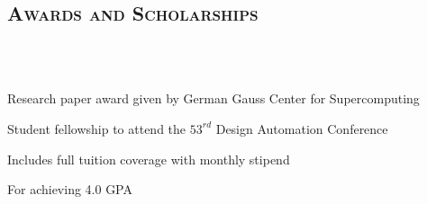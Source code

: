 \begin{resume}
	
	\section{\textsc{Awards and Scholarships}}
	
	\begin{formatb}
		\\
		\body\\
	\end{formatb}

  \begin{position}
    Research paper award given by German Gauss Center for Supercomputing
  \end{position}

  \begin{position}
    Student fellowship to attend the $53^{rd}$ Design Automation Conference
  \end{position}
	
	\begin{position}
		Includes full tuition coverage with monthly stipend
	\end{position}
	
	
	
	
	\begin{position}
		For achieving 4.0 GPA
	\end{position}
	
	

\end{resume}
